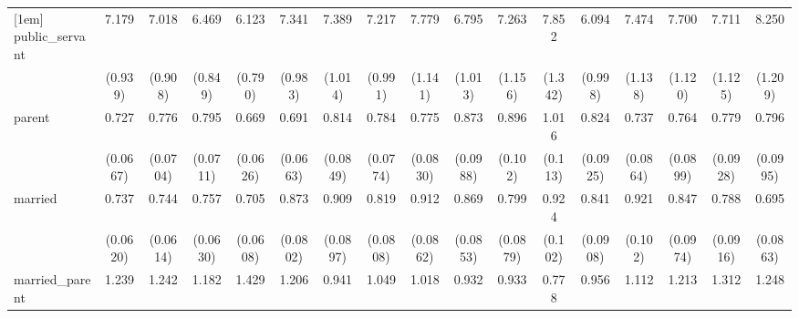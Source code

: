 {\begin{tabular}{l*{16}{c}}
[1em]
public\_servant      &       7.179\sym{***}&       7.018\sym{***}&       6.469\sym{***}&       6.123\sym{***}&       7.341\sym{***}&       7.389\sym{***}&       7.217\sym{***}&       7.779\sym{***}&       6.795\sym{***}&       7.263\sym{***}&       7.852\sym{***}&       6.094\sym{***}&       7.474\sym{***}&       7.700\sym{***}&       7.711\sym{***}&       8.250\sym{***}\\
                    &     (0.939)         &     (0.908)         &     (0.849)         &     (0.790)         &     (0.983)         &     (1.014)         &     (0.991)         &     (1.141)         &     (1.013)         &     (1.156)         &     (1.342)         &     (0.998)         &     (1.138)         &     (1.120)         &     (1.125)         &     (1.209)         \\
[1em]
parent              &       0.727\sym{***}&       0.776\sym{**} &       0.795\sym{*}  &       0.669\sym{***}&       0.691\sym{***}&       0.814\sym{*}  &       0.784\sym{*}  &       0.775\sym{*}  &       0.873         &       0.896         &       1.016         &       0.824         &       0.737\sym{**} &       0.764\sym{*}  &       0.779\sym{*}  &       0.796         \\
                    &    (0.0667)         &    (0.0704)         &    (0.0711)         &    (0.0626)         &    (0.0663)         &    (0.0849)         &    (0.0774)         &    (0.0830)         &    (0.0988)         &     (0.102)         &     (0.113)         &    (0.0925)         &    (0.0864)         &    (0.0899)         &    (0.0928)         &    (0.0995)         \\
[1em]
married             &       0.737\sym{***}&       0.744\sym{***}&       0.757\sym{***}&       0.705\sym{***}&       0.873         &       0.909         &       0.819\sym{*}  &       0.912         &       0.869         &       0.799\sym{*}  &       0.924         &       0.841         &       0.921         &       0.847         &       0.788\sym{*}  &       0.695\sym{**} \\
                    &    (0.0620)         &    (0.0614)         &    (0.0630)         &    (0.0608)         &    (0.0802)         &    (0.0897)         &    (0.0808)         &    (0.0862)         &    (0.0853)         &    (0.0879)         &     (0.102)         &    (0.0908)         &     (0.102)         &    (0.0974)         &    (0.0916)         &    (0.0863)         \\
[1em]
married\_parent      &       1.239         &       1.242         &       1.182         &       1.429\sym{**} &       1.206         &       0.941         &       1.049         &       1.018         &       0.932         &       0.933         &       0.778         &       0.956         &       1.112         &       1.213         &       1.312         &       1.248         \\

\end{tabular}}
